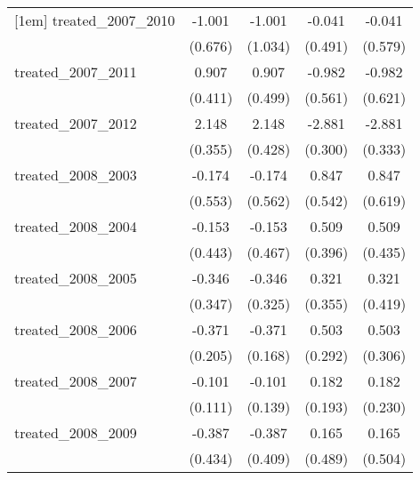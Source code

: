 {\begin{tabular}{l*{4}{c}}
[1em]
treated\_2007\_2010&      -1.001         &      -1.001         &      -0.041         &      -0.041         \\
            &     (0.676)         &     (1.034)         &     (0.491)         &     (0.579)         \\
[1em]
treated\_2007\_2011&       0.907\sym{*}  &       0.907         &      -0.982         &      -0.982         \\
            &     (0.411)         &     (0.499)         &     (0.561)         &     (0.621)         \\
[1em]
treated\_2007\_2012&       2.148\sym{***}&       2.148\sym{***}&      -2.881\sym{***}&      -2.881\sym{***}\\
            &     (0.355)         &     (0.428)         &     (0.300)         &     (0.333)         \\
[1em]
treated\_2008\_2003&      -0.174         &      -0.174         &       0.847         &       0.847         \\
            &     (0.553)         &     (0.562)         &     (0.542)         &     (0.619)         \\
[1em]
treated\_2008\_2004&      -0.153         &      -0.153         &       0.509         &       0.509         \\
            &     (0.443)         &     (0.467)         &     (0.396)         &     (0.435)         \\
[1em]
treated\_2008\_2005&      -0.346         &      -0.346         &       0.321         &       0.321         \\
            &     (0.347)         &     (0.325)         &     (0.355)         &     (0.419)         \\
[1em]
treated\_2008\_2006&      -0.371         &      -0.371\sym{*}  &       0.503         &       0.503         \\
            &     (0.205)         &     (0.168)         &     (0.292)         &     (0.306)         \\
[1em]
treated\_2008\_2007&      -0.101         &      -0.101         &       0.182         &       0.182         \\
            &     (0.111)         &     (0.139)         &     (0.193)         &     (0.230)         \\
[1em]
treated\_2008\_2009&      -0.387         &      -0.387         &       0.165         &       0.165         \\
            &     (0.434)         &     (0.409)         &     (0.489)         &     (0.504)         \\

\end{tabular}}
